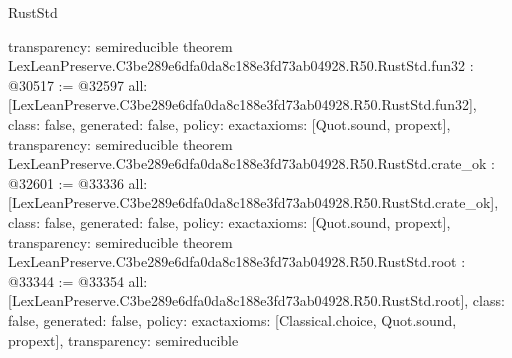 \begin{lexlean}{RustStd}
\begin{coremodule}
{  transparency: semireducible
}
theorem LexLeanPreserve.C3be289e6dfa0da8c188e3fd73ab04928.R50.RustStd.fun32 : @30517 := @32597 {
  all: [LexLeanPreserve.C3be289e6dfa0da8c188e3fd73ab04928.R50.RustStd.fun32],
  class: false,
  generated: false,
  policy: exact{axioms: [Quot.sound, propext]},
  transparency: semireducible
}
theorem LexLeanPreserve.C3be289e6dfa0da8c188e3fd73ab04928.R50.RustStd.crate_ok : @32601 := @33336 {
  all: [LexLeanPreserve.C3be289e6dfa0da8c188e3fd73ab04928.R50.RustStd.crate_ok],
  class: false,
  generated: false,
  policy: exact{axioms: [Quot.sound, propext]},
  transparency: semireducible
}
theorem LexLeanPreserve.C3be289e6dfa0da8c188e3fd73ab04928.R50.RustStd.root : @33344 := @33354 {
  all: [LexLeanPreserve.C3be289e6dfa0da8c188e3fd73ab04928.R50.RustStd.root],
  class: false,
  generated: false,
  policy: exact{axioms: [Classical.choice, Quot.sound, propext]},
  transparency: semireducible
}


\end{coremodule}
\end{lexlean}
